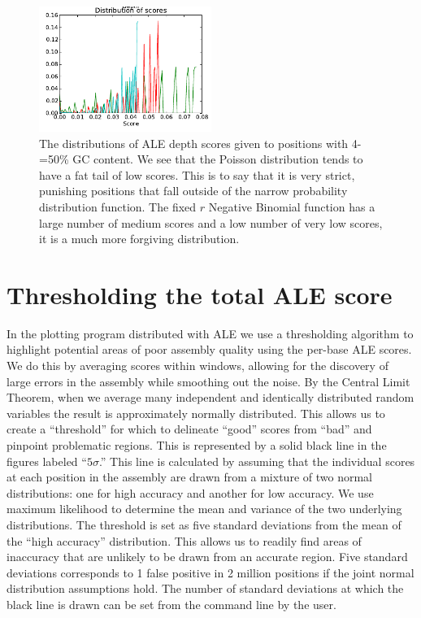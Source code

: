 \documentclass[phd,tocprelim]{cornell}
\begin{document}
\begin{figure}[hptb]
    \centerline{\includegraphics[width=0.5\textwidth]{figures/ALE/GC_depth_distribution_of_scores.png}}
    \caption[Distribution of scores using various distributions]{The distributions of ALE depth scores given to positions with 4-=50\% GC content. We see that the Poisson distribution tends to have a fat tail of low scores. This is to say that it is very strict, punishing positions that fall outside of the narrow probability distribution function. The fixed $r$ Negative Binomial function has a large number of medium scores and a low number of very low scores, it is a much more forgiving distribution.}\label{fig:GC5}
\end{figure}



\section{Thresholding the total ALE score} %
\label{sec:Thresholding the total ALE score}

In the plotting program distributed with ALE we use a thresholding algorithm to highlight potential areas of poor assembly quality using the per-base ALE scores. We do this by averaging scores within windows, allowing for the discovery of large errors in the assembly while smoothing out the noise. By the Central Limit Theorem, when we average many independent and identically distributed random variables the result is approximately normally distributed. This allows us to create a “threshold” for which to delineate “good” scores from “bad” and pinpoint problematic regions. This is represented by a solid black line in the figures labeled “$5\sigma$.” This line is calculated by assuming that the individual scores at each position in the assembly are drawn from a mixture of two normal distributions: one for high accuracy and another for low accuracy. We use maximum likelihood to determine the mean and variance of the two underlying distributions. The threshold is set as five standard deviations from the mean of the “high accuracy” distribution. This allows us to readily find areas of inaccuracy that are unlikely to be drawn from an accurate region. Five standard deviations corresponds to 1 false positive in 2 million positions if the joint normal distribution assumptions hold.  The number of standard deviations at which the black line is drawn can be set from the command line by the user.
\end{document}
